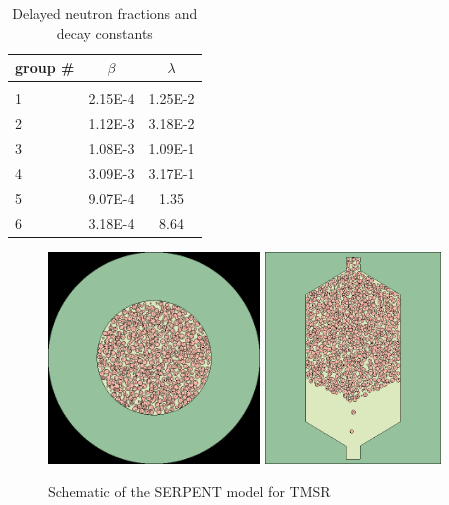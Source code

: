 \documentclass{elsarticle}
\begin{document}
\begin{table}
\caption{Delayed neutron fractions and decay constants}
\centering
    \begin{tabular}[h]{lcc}
      group \# & $\beta$ & $\lambda$\\
      \hline\\
      1 & 2.15E-4 & 1.25E-2\\
      2 & 1.12E-3 & 3.18E-2\\
      3 & 1.08E-3 & 1.09E-1\\
      4 & 3.09E-3 & 3.17E-1\\
      5 & 9.07E-4 & 1.35\\
      6 & 3.18E-4 & 8.64\\
      \hline
    \end{tabular}
  \label{tab:delayed_neutrons}
\end{table}


\begin{figure}
  \centering
  \includegraphics[width=0.5\textwidth]{./images/design/tmsr_sf1_geom1.png}
  \includegraphics[width=0.415\textwidth]{./images/design/tmsr_sf1_geom2.png}
  \caption{Schematic of the SERPENT model for TMSR}
  \label{fig:serpent}
\end{figure}
\end{document}
